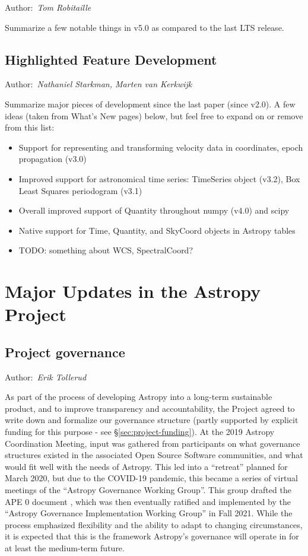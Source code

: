 \documentclass[modern]{aastex631}
\newcommand{\secauthor}[1]{{\color{blue}Author:~\textit{#1}}}
\begin{document}
\secauthor{Tom Robitaille}

Summarize a few notable things in v5.0 as compared to the last LTS release.


\subsection{Highlighted Feature Development} \label{sec:core-features}

\secauthor{Nathaniel Starkman, Marten van Kerkwijk}

Summarize major pieces of development since the last paper (since v2.0). A few
ideas (taken from What's New pages) below, but feel free to expand on or remove
from this list:
\begin{itemize}
    \item Support for representing and transforming velocity data in coordinates, epoch propagation (v3.0)
    \item Improved support for astronomical time series: TimeSeries object (v3.2), Box Least Squares periodogram (v3.1)
    \item Overall improved support of Quantity throughout numpy (v4.0) and scipy
    \item Native support for Time, Quantity, and SkyCoord objects in Astropy tables
    \item TODO: something about WCS, SpectralCoord?
\end{itemize}


\section{Major Updates in the Astropy Project} \label{sec:project-updates}

\subsection{Project governance} \label{sec:project-governance}

\secauthor{Erik Tollerud}


As part of the process of developing Astropy into a long-term sustainable
product, and to improve transparency and accountability, the Project agreed to
write down and formalize our governance structure (partly supported by explicit
funding for this purpose - see \S \ref{sec:project-funding}). At the 2019
Astropy Coordination Meeting, input was gathered from participants on what governance
structures existed in the associated Open Source Software communities, and what
would fit well with the needs of Astropy. This led into a ``retreat'' planned
for March 2020, but due to the COVID-19 pandemic, this became a series of
virtual meetings of the ``Astropy Governance Working Group''.  This group
drafted the APE 0 document \citep{ape0}, which was then eventually ratified and
implemented by the ``Astropy Governance Implementation Working Group'' in Fall
2021. While the process emphasized flexibility and the ability to adapt to
changing circumstances, it is expected that this is the framework Astropy's
governance will operate in for at least the medium-term future.
\end{document}
